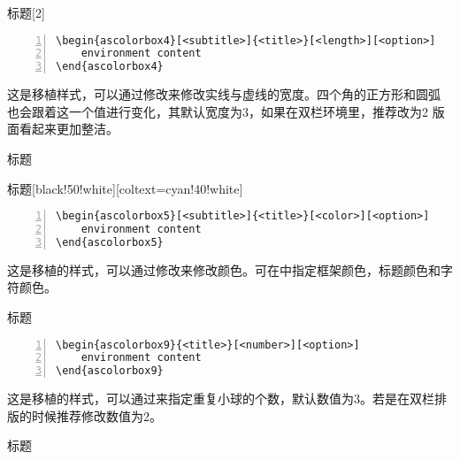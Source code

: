 \begin{ascolorbox4}[子标题]{标题}[2]
    \zhlipsum[1]
\end{ascolorbox4}

\begin{lstlisting}[backgroundcolor=\color{gray!5},framerule=1pt,frame=tb,numbers=left,
    numberstyle=\tiny\color{black},]
\begin{ascolorbox4}[<subtitle>]{<title>}[<length>][<option>]
    environment content
\end{ascolorbox4}
\end{lstlisting}
这是移植样式，可以通过修改\md{[⟨length⟩]}来修改实线与虚线的宽度。四个角的正方形和圆弧
也会跟着这一个值进行变化，其默认宽度为3，如果在双栏环境里，推荐改为2 版面看起来更加整洁。

\begin{ascolorbox5}[子标题]{标题}
    \zhlipsum[1]
\end{ascolorbox5}

\begin{ascolorbox5}[子标题]{标题}[black!50!white][coltext=cyan!40!white]
    \zhlipsum[1]
\end{ascolorbox5}
\begin{lstlisting}[backgroundcolor=\color{gray!5},framerule=1pt,frame=tb,numbers=left,
    numberstyle=\tiny\color{black},]
\begin{ascolorbox5}[<subtitle>]{<title>}[<color>][<option>]
    environment content
\end{ascolorbox5}
\end{lstlisting}
这是移植的样式，可以通过修改\md{[⟨color⟩]}来修改颜色。可在\md{[⟨option⟩]}中指定框架颜色，标题颜色和字符颜色。

\begin{ascolorbox9}{标题}
    \zhlipsum[1]
\end{ascolorbox9}
\begin{lstlisting}[backgroundcolor=\color{gray!5},framerule=1pt,frame=tb,numbers=left,
    numberstyle=\tiny\color{black},]
\begin{ascolorbox9}{<title>}[<number>][<option>]
    environment content
\end{ascolorbox9}
\end{lstlisting}
这是移植的样式，可以通过\md{[⟨number⟩]}来指定重复小球的个数，默认数值为3。若是在双栏排
版的时候推荐修改数值为2。

\begin{ascolorbox10}[子标题]{标题}
    \zhlipsum[1]
\end{ascolorbox10}

